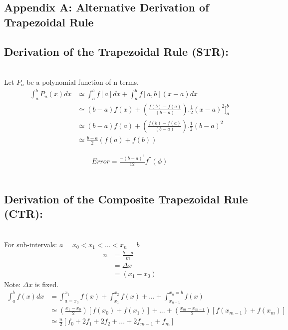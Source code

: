 \documentclass[11pt]{article}
\begin{document}
\begin{page}
\break
\section{Appendix A: Alternative Derivation of Trapezoidal Rule}
\subsection{Derivation of the Trapezoidal Rule (STR):}\\
\noindent Let $P_n$ be a polynomial function of n terms.\\

\begin{equation}
\begin{aligned}
    \int_{a}^{b} P_n(x) dx &\simeq{} \int_{a}^{b} f[a]dx + \int_{a}^{b} f[a,b](x-a)dx\\
    &\simeq{} (b-a)f(x) + (\frac{f(b)-f(a)}{(b-a)}).\frac{1}{2}(x-a)^{2}]_{a}^{b}\\
    &\simeq{} (b-a)f(a) + (\frac{f(b)-f(a)}{(b-a)}).\frac{1}{2}(b-a)^{2}\\
    &\simeq{} \frac{b-a}{2}(f(a)+f(b))
\end{aligned}
\end{equation}

\begin{equation}
\begin{aligned}
    Error = \frac{-(b-a)^{3}}{12}f^{''}(\phi)
\end{aligned}
\end{equation} 
\\

\subsection{Derivation of the Composite Trapezoidal Rule (CTR):}\\
\noindent For sub-intervals: $a = x_0 < x_1 < ... < x_n = b$
\\

\begin{equation}
\begin{aligned}
    n &= \frac{b-a}{m}\\
    & = \Delta{x}\\
    & = (x_1 - x_0)
\end{aligned}
\end{equation}
Note: $\Delta{x}$ is fixed.
\\
\begin{equation}
\begin{aligned}
    \int_a^b f(x) dx &= \int_{a=x_0}^{x_1} f(x) + \int_{x_1}^{x_2} f(x) + ... + \int_{x_{n-1}}^{x_n=b} f(x)\\
    &\simeq{} (\frac{x_1 - x_0}{2})[f(x_0) + f(x_1)] + ... + (\frac{x_m - x_{m-1}}{2})[f(x_{m-1}) + f(x_m)]\\
    &\simeq{} \frac{n}{2}[f_0 + 2f_1 + 2f_2 + ... + 2f_{m-1} + f_m]
\end{aligned}
\end{equation}
\\


\end{page}
\end{document}
